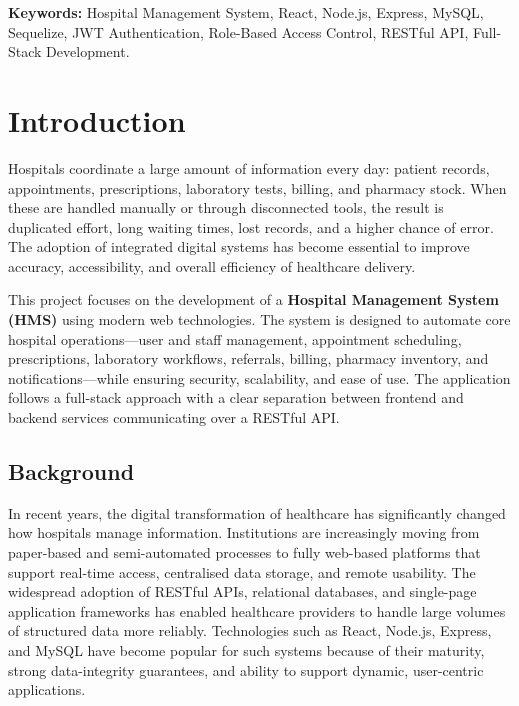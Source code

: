 \documentclass[12pt,a4paper]{report}
\begin{document}
\vspace{0.4cm}
\noindent\textbf{Keywords:} Hospital Management System, React, Node.js, Express,
MySQL, Sequelize, JWT Authentication, Role-Based Access Control, RESTful API,
Full-Stack Development.

\tableofcontents
\listoffigures
\listoftables

\clearpage
{}

\chapter{Introduction}
Hospitals coordinate a large amount of information every day: patient records,
appointments, prescriptions, laboratory tests, billing, and pharmacy stock. When these
are handled manually or through disconnected tools, the result is duplicated effort,
long waiting times, lost records, and a higher chance of error. The adoption of
integrated digital systems has become essential to improve accuracy, accessibility, and
overall efficiency of healthcare delivery.

This project focuses on the development of a \textbf{Hospital Management System (HMS)}
using modern web technologies. The system is designed to automate core hospital
operations---user and staff management, appointment scheduling, prescriptions,
laboratory workflows, referrals, billing, pharmacy inventory, and notifications---while
ensuring security, scalability, and ease of use. The application follows a full-stack
approach with a clear separation between frontend and backend services communicating
over a RESTful API.

\section{Background}
In recent years, the digital transformation of healthcare has significantly changed how
hospitals manage information. Institutions are increasingly moving from paper-based and
semi-automated processes to fully web-based platforms that support real-time access,
centralised data storage, and remote usability. The widespread adoption of RESTful
APIs, relational databases, and single-page application frameworks has enabled
healthcare providers to handle large volumes of structured data more reliably.
Technologies such as React, Node.js, Express, and MySQL have become popular for such
systems because of their maturity, strong data-integrity guarantees, and ability to
support dynamic, user-centric applications.
\end{document}
